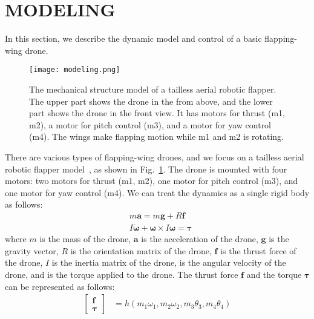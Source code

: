 \section{MODELING}
\label{sec:modeling}
In this section, we describe the dynamic model and control of a basic flapping-wing drone.
\begin{figure}[t]
    \centering
    \texttt{[image: modeling.png]}
    \caption{The mechanical structure model of a tailless aerial robotic flapper.
    The upper part shows the drone in the from above, and the lower part shows the drone in the front view.
    It has motors for thrust (m1, m2), a motor for pitch control (m3), and a motor for yaw control (m4).
    The wings make flapping motion while m1 and m2 is rotating.
    }
    \label{figure:modeling}
  \end{figure}
There are various types of flapping-wing drones, and we focus on a tailless aerial robotic flapper model~\cite{karasek2018tailless}, as shown in Fig.~\ref{figure:modeling}.
The drone is mounted with four motors: two motors for thrust (m1, m2), one motor for pitch control (m3), and one motor for yaw control (m4).
We can treat the dynamics as a single rigid body as follows:
\begin{equation}
    \begin{aligned}
      &m\bm{a} = m\bm{g} + \mathit{R}\bm{f} \\
      &\mathit{I}\dot{\bm{\omega}} + \bm{\omega} \times \mathit{I}\bm{\omega} = \bm{\tau}
    \end{aligned}
\end{equation}
where $m$ is the mass of the drone, 
$\bm{a}$ is the acceleration of the drone,
$\bm{g}$ is the gravity vector,
$\mathit{R}$ is the orientation matrix of the drone,
$\bm{f}$ is the thrust force of the drone,
$\mathit{I}$ is the inertia matrix of the drone, 
\bm{$\omega$} is the angular velocity of the drone, 
and \bm{$\tau$} is the torque applied to the drone.
The thrust force $\bm{f}$ and the torque $\bm{\tau}$ can be represented as follows:
\begin{equation}
  \label{eq:control}
  \begin{aligned}
    \begin{bmatrix}
      \bm{f}\\
      \bm{\tau}
    \end{bmatrix}
    &=
    h(m_1\omega_1, m_2\omega_2, m_3\theta_3, m_4\theta_4)\\
  \end{aligned}
\end{equation}
